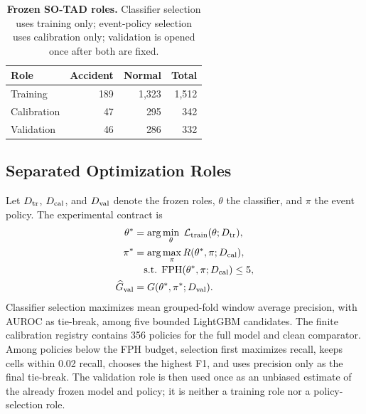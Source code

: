 \documentclass[letterpaper]{article}
\begin{document}
\begin{table}[t]
\centering
\small
\caption{\textbf{Frozen SO-TAD roles.} Classifier selection uses training only; event-policy selection uses calibration only; validation is opened once after both are fixed.}
\label{tab:roles}
\begin{tabular}{lrrr}
\toprule
Role & Accident & Normal & Total \\
\midrule
Training & 189 & 1,323 & 1,512 \\
Calibration & 47 & 295 & 342 \\
Validation & 46 & 286 & 332 \\
\bottomrule
\end{tabular}
\end{table}

\subsection{Separated Optimization Roles}
Let $D_{\rm tr}$, $D_{\rm cal}$, and $D_{\rm val}$ denote the frozen roles, $\theta$ the classifier, and $\pi$ the event policy. The experimental contract is
\begin{align}
\theta^* &= \arg\min_{\theta}\;\mathcal{L}_{\rm train}(\theta;D_{\rm tr}),\\
\pi^* &= \arg\max_{\pi} R(\theta^*,\pi;D_{\rm cal}),\notag\\[-2pt]
&\quad\text{s.t. }\mathrm{FPH}(\theta^*,\pi;D_{\rm cal})\leq5,\\
\widehat{G}_{\rm val} &= G(\theta^*,\pi^*;D_{\rm val}).
\end{align}
Classifier selection maximizes mean grouped-fold window average precision, with AUROC as tie-break, among five bounded LightGBM candidates. The finite calibration registry contains 356 policies for the full model and clean comparator. Among policies below the FPH budget, selection first maximizes recall, keeps cells within 0.02 recall, chooses the highest F1, and uses precision only as the final tie-break. The validation role is then used once as an unbiased estimate of the already frozen model and policy; it is neither a training role nor a policy-selection role.
\end{document}

